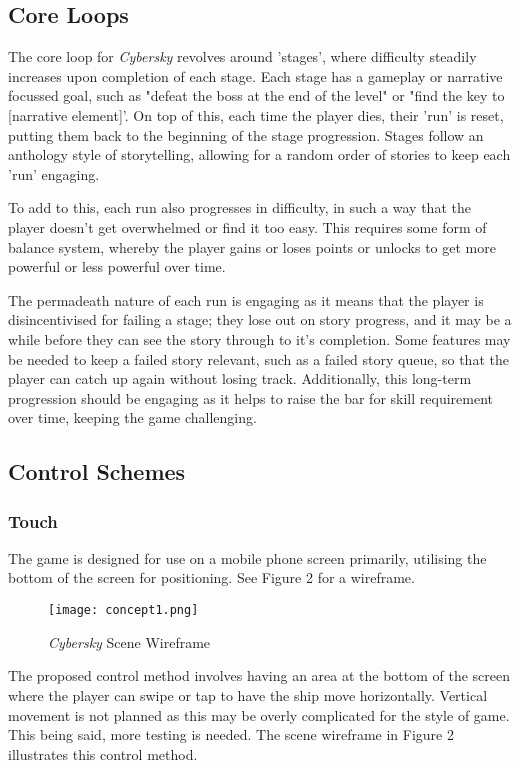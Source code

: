 \documentclass{scrartcl}
\begin{document}
\subsection{Core Loops}

The core loop for \emph{Cybersky} revolves around 'stages', where difficulty steadily increases upon completion of each stage. Each stage has a gameplay or narrative focussed goal, such as "defeat the boss at the end of the level" or "find the key to [narrative element]'. On top of this, each time the player dies, their 'run' is reset, putting them back to the beginning of the stage progression. Stages follow an anthology style of storytelling, allowing for a random order of stories to keep each 'run' engaging.

To add to this, each run also progresses in difficulty, in such a way that the player doesn't get overwhelmed or find it too easy. This requires some form of balance system, whereby the player gains or loses points or unlocks to get more powerful or less powerful over time.

The permadeath nature of each run is engaging as it means that the player is disincentivised for failing a stage; they lose out on story progress, and it may be a while before they can see the story through to it's completion. Some features may be needed to keep a failed story relevant, such as a failed story queue, so that the player can catch up again without losing track. Additionally, this long-term progression should be engaging as it helps to raise the bar for skill requirement over time, keeping the game challenging.

\subsection{Control Schemes}

\subsubsection{Touch}

The game is designed for use on a mobile phone screen primarily, utilising the bottom of the screen for positioning. See Figure 2 for a wireframe.

\begin{figure}[!h]
  \centering
  \texttt{[image: concept1.png]}
  \caption[\textit{Cybersky}]{\textit{Cybersky} Scene Wireframe}
\end{figure}

The proposed control method involves having an area at the bottom of the screen where the player can swipe or tap to have the ship move horizontally. Vertical movement is not planned as this may be overly complicated for the style of game. This being said, more testing is needed. The scene wireframe in Figure 2 illustrates this control method.
\end{document}
